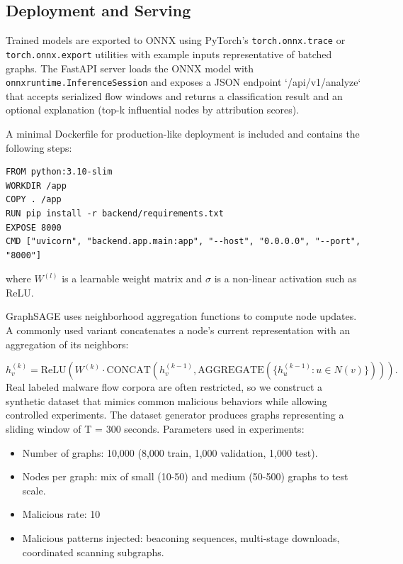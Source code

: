\documentclass[conference]{IEEEtran}
\begin{document}
\subsection{Deployment and Serving}

Trained models are exported to ONNX using PyTorch's \texttt{torch.onnx.trace} or \texttt{torch.onnx.export} utilities with example inputs representative of batched graphs. The FastAPI server loads the ONNX model with \texttt{onnxruntime.InferenceSession} and exposes a JSON endpoint `/api/v1/analyze` that accepts serialized flow windows and returns a classification result and an optional explanation (top-k influential nodes by attribution scores).

A minimal Dockerfile for production-like deployment is included and contains the following steps:

\begin{verbatim}
FROM python:3.10-slim
WORKDIR /app
COPY . /app
RUN pip install -r backend/requirements.txt
EXPOSE 8000
CMD ["uvicorn", "backend.app.main:app", "--host", "0.0.0.0", "--port", "8000"]
\end{verbatim}

where $W^{(l)}$ is a learnable weight matrix and $\sigma$ is a non-linear activation such as ReLU.

GraphSAGE uses neighborhood aggregation functions  to compute node updates. A commonly used variant concatenates a node's current representation with an aggregation of its neighbors:

\begin{equation}
h_v^{(k)} = \text{ReLU}\left( W^{(k)} \cdot \text{CONCAT}\left(h_v^{(k-1)}, \text{AGGREGATE}\left( \{ h_u^{(k-1)} : u \in N(v) \} \right)\right) \right).
\end{equation}
Real labeled malware flow corpora are often restricted, so we construct a synthetic dataset that mimics common malicious behaviors while allowing controlled experiments. The dataset generator produces graphs representing a sliding window of T = 300 seconds. Parameters used in experiments:

\begin{itemize}
  \item Number of graphs: 10,000 (8,000 train, 1,000 validation, 1,000 test).
  \item Nodes per graph: mix of small (10-50) and medium (50-500) graphs to test scale.
  \item Malicious rate: 10%
  \item Malicious patterns injected: beaconing sequences, multi-stage downloads, coordinated scanning subgraphs.
\end{itemize}
\end{document}
